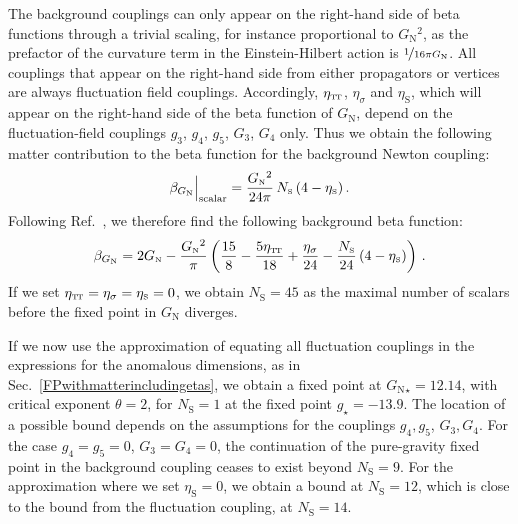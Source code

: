 \documentclass[11pt]{book}
\newcommand\TTspace{ -1pt }
\newcommand\etaTT{ \eta_{\scriptscriptstyle{\mathrm{T\hspace{\TTspace}T}}} }
\newcommand\etaS{ \eta_{\scriptscriptstyle{\mathrm{S}}} }
\newcommand\NS{ N_{\scriptscriptstyle{\mathrm{S}}} }
\newcommand\GNewton{ G_{\scriptscriptstyle{\mathrm{N}}}{} }
\newcommand\Gback{ \GNewton } %
\numberwithin{equation}{chapter}
\begin{document}
The background couplings can only appear on the right-hand side of beta functions through a trivial scaling,
for instance proportional to $\Gback^2$, as the prefactor of the curvature term in the Einstein-Hilbert
action is $\nicefrac{1}{16 \pi \Gback}$.
All couplings that appear on the right-hand side from either propagators or vertices are always
fluctuation field couplings.
Accordingly, $\etaTT$, $\eta_{\sigma}$ and $\etaS$,
which will appear on the right-hand side of the beta function of $\Gback$,
depend on the fluctuation-field couplings $g_3$, $g_4$, $g_5$, $G_3$, $G_4$ only.
Thus we obtain the following matter contribution to the beta function for the background Newton coupling:
\begin{align}
  \beta_{\Gback} \Big|_{\rm scalar} = \frac{\Gback^2}{24 \pi} \, \NS \, (4-\etaS) \,.
\end{align}
Following Ref.~\cite{Percacci:2015wwa}, we therefore find the following background beta function:
\begin{align}
  \beta_{\Gback} = 2 \Gback
    - \frac{\Gback^2}{\pi}
  \left(
      \frac{15}{8}
    - \frac{5\etaTT}{18}
    + \frac{\eta_{\sigma}}{24}
    -  \frac{\NS}{24} \, (4 - \etaS)
  \right) \,.
\end{align}
If we set $\etaTT = \eta_{\sigma} = \etaS = 0$, we obtain $\NS=45$ as the maximal
number of scalars before the fixed point in $\Gback$ diverges.

If we now use the approximation of equating all fluctuation couplings in the expressions
for the anomalous dimensions, as in Sec.~\ref{FPwithmatterincludingetas},
we obtain a fixed point at $\Gback_{\star}=12.14$, with critical exponent $\theta=2$,
for $\NS=1$ at the fixed point $g_{\star}=-13.9$.
The location of a possible bound depends on the assumptions for the couplings $g_4, g_5$, $G_3, G_4$.
For the case $g_4 = g_5 = 0$, $G_3 = G_4 = 0$,
the continuation of the pure-gravity fixed point in the background coupling ceases to exist beyond $\NS=9$.
For the approximation where we set $\etaS = 0$, we obtain a bound at $\NS=12$,
which is close to the bound from the fluctuation coupling, at $\NS=14$.
\end{document}
